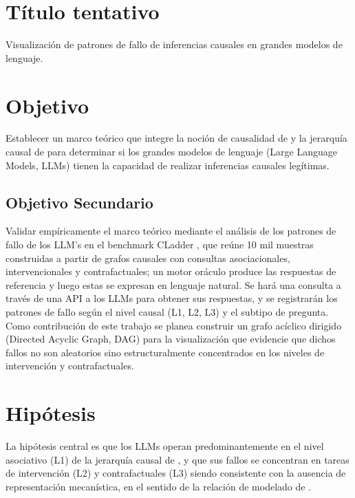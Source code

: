 \documentclass{article}
\begin{document}
\section{Título tentativo}
Visualización de patrones de fallo de inferencias causales en grandes 
modelos de lenguaje.

\section{Objetivo}

Establecer un marco teórico que integre la noción de causalidad de \textcite{rosen2012anticipatory} 
y la jerarquía causal de \textcite{pearl2009causality} para determinar si los grandes modelos de lenguaje (Large Language Models, LLMs) 
tienen la capacidad de realizar inferencias causales legítimas.

\subsection{Objetivo Secundario}

Validar empíricamente el marco teórico mediante el análisis de los patrones de fallo 
de los LLM's en el benchmark CLadder \parencite{jin2023cladder}, que reúne 10 mil 
muestras construidas a partir de grafos causales con consultas asociacionales, 
intervencionales y contrafactuales; un motor oráculo produce las respuestas de 
referencia y luego estas se expresan en lenguaje natural. Se hará una consulta a través de una API a 
los LLMs para obtener sus respuestas, y se registrarán los patrones de fallo según el nivel causal (L1, L2, L3) y el subtipo de pregunta.
Como contribución de este trabajo se planea construir un grafo acíclico dirigido 
(Directed Acyclic Graph, DAG) para la visualización 
que evidencie que dichos fallos no son aleatorios sino estructuralmente 
concentrados en los niveles de intervención y contrafactuales. 

\section{Hipótesis}

La hipótesis central es que los LLMs operan predominantemente en el nivel asociativo (L1) 
de la jerarquía causal de \textcite{pearl2009causality}, y que sus fallos se concentran en tareas 
de intervención (L2) y contrafactuales (L3) siendo consistente con la ausencia de 
representación mecanística, en el sentido de la relación de modelado de \textcite{rosen2012anticipatory}.
\end{document}
